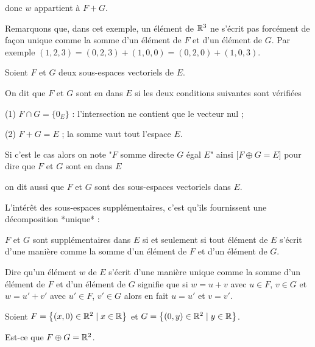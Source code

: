 \change

donc $w$ appartient à $F+G$.

\change

Remarquons que, dans cet exemple, un élément de $\mathbb{R}^3$ ne s'écrit pas forcément de façon unique 
comme la somme d'un élément de $F$ et d'un élément de $G$. Par exemple  
$(1,2,3)=(0,2,3)+ (1,0,0)= (0,2,0)+(1,0,3).$


\diapo


Soient $F$ et $G$ deux sous-espaces vectoriels de $E$.

On dit que $F$ et $G$ sont en  dans $E$ si 
les deux conditions suivantes sont vérifiées 

(1) $F \cap G = \{ 0_E \}$ : l'intersection ne contient que le vecteur nul ;

(2) $F+G=E$ ; la somme vaut tout l'espace $E$.

\change

Si c'est le cas alors on note "$F$ somme directe $G$ égal $E$" ainsi [$F \oplus G=E$] pour dire que 
$F$ et $G$ sont en  dans $E$

\change


on dit aussi que $F$ et $G$ sont des sous-espaces vectoriels  dans $E$.


\change

L'intérêt des sous-espaces supplémentaires, c'est qu'ils fournissent une décomposition *unique* :


$F$ et $G$ sont supplémentaires dans $E$ si et seulement si tout 
élément de $E$ s'écrit d'une manière  
comme la somme d'un élément de $F$ et d'un élément de $G$. 

\change

Dire qu'un élément $w$ de $E$ s'écrit d'une manière unique comme la somme d'un élément de $F$ et d'un élément de $G$
  signifie que si $w=u+v$ avec $u\in F$, $v\in G$ et $w=u'+v'$ avec $u'\in F$, $v'\in G$
alors en fait $u=u'$ et $v=v'$. 



\diapo

Soient $F = \big\{ (x,0) \in \mathbb{R}^2 \mid x \in \mathbb{R} \big\}$
et $G = \big\{ (0,y) \in \mathbb{R}^2 \mid y \in \mathbb{R} \big\}$.

\change

Est-ce que $F \oplus G = \mathbb{R}^2$.

\change

